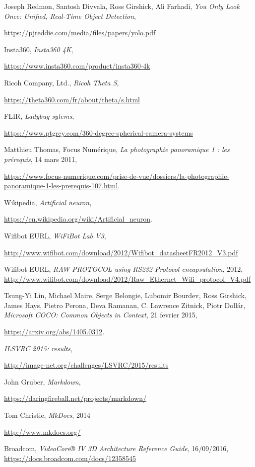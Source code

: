 \begin{thebibliography}{9}
		Joseph Redmon, Santosh Divvala, Ross Girshick, Ali Farhadi,
		\emph{You Only Look Once: Unified, Real-Time Object Detection},
		\par
		\url{https://pjreddie.com/media/files/papers/yolo.pdf}
	
		Insta360,
		\emph{Insta360 4K},
		\par
		\url{https://www.insta360.com/product/insta360-4k}
	
		Ricoh Company, Ltd.,
		\emph{Ricoh Theta S},
		\par
		\url{https://theta360.com/fr/about/theta/s.html}
	
		FLIR,
		\emph{Ladybug sytems},
		\par
		\url{https://www.ptgrey.com/360-degree-spherical-camera-systems}
		
		Matthieu Thomas,
		Focus Numérique,
		\emph{La photographie panoramique 1 : les prérequis},
		14 mars 2011,
		\par
		\url{https://www.focus-numerique.com/prise-de-vue/dossiers/la-photographie-panoramique-1-les-prerequis-107.html}.

		Wikipedia,
		\emph{Artificial neuron},
		\par
		\url{https://en.wikipedia.org/wiki/Artificial_neuron}.

		Wifibot EURL,
		\emph{WiFiBot Lab V3},
		\par
		\url{http://www.wifibot.com/download/2012/Wifibot_datasheetFR2012_V3.pdf}
	
		Wifibot EURL,
		\emph{RAW PROTOCOL using RS232 Protocol encapsulation},
		2012,
		\url{http://www.wifibot.com/download/2012/Raw_Ethernet_Wifi_protocol_V4.pdf}
		
		Tsung-Yi Lin, Michael Maire, Serge Belongie, Lubomir Bourdev, Ross Girshick, James Hays, Pietro Perona, Deva Ramanan, C. Lawrence Zitnick, Piotr Dollár,
		\emph{Microsoft COCO: Common Objects in Context},
		21 fevrier 2015,
		\par
		\url{https://arxiv.org/abs/1405.0312}.

		\emph{ILSVRC 2015: results},
		\par
		\url{http://image-net.org/challenges/LSVRC/2015/results}
		
		John Gruber,
		\emph{Markdown},
		\par
		\url{https://daringfireball.net/projects/markdown/}

		Tom Christie,
		\emph{MkDocs},
		2014
		\par
		\url{http://www.mkdocs.org/}

		Broadcom,
		\emph{VideoCore® IV 3D Architecture Reference Guide},
		16/09/2016,
		\url{https://docs.broadcom.com/docs/12358545}

\end{thebibliography}
